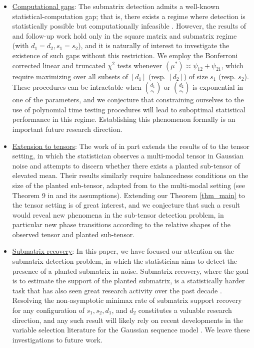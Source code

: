 \documentclass{article}
\theoremstyle{remark}
\begin{document}
\begin{itemize}
    \item \underline{Computational gaps}: The submatrix detection admits a well-known statistical-computation gap; that is, there exists a regime where detection is statistically possible but computationally infeasible \citep{ma2015computational}. However, the results of \citet{ma2015computational} and follow-up work \citep{brennan2019universality, brennan2018reducibility} hold only in the square matrix and submatrix regime (with $d_1 = d_2, s_1 = s_2$), and it is naturally of interest to investigate the existence of such gaps without this restriction. We employ the Bonferroni corrected linear and truncated $\chi^2$ tests whenever $(\mu^*) \asymp \psi_{12} + \psi_{21}$, which require maximizing over all subsets of $[d_1]$ (resp. $[d_2]$) of size $s_1$ (resp. $s_2$). These procedures can be intractable when ${d_1 \choose s_1}$ or ${d_2 \choose s_2}$ is exponential in one of the parameters, and we conjecture that constraining ourselves to the use of polynomial time testing procedures will lead to suboptimal statistical performance in this regime. Establishing this phenomenon formally is an important future research direction.
    \item \underline{Extension to tensors}: The work of \citet{luo2022tensor} in part extends the results of \citet{butucea2013detection} to the tensor setting, in which the statistician observes a multi-modal tensor in Gaussian noise and attempts to discern whether there exists a planted sub-tensor of elevated mean. Their results similarly require balancedness conditions on the size of the planted sub-tensor, adapted from \citet{butucea2013detection} to the multi-modal setting (see Theorem 9 in \citet{luo2022tensor} and its assumptions). Extending our Theorem \ref{thm_main} to the tensor setting is of great interest, and we conjecture that such a result would reveal new phenomena in the sub-tensor detection problem, in particular new phase transitions according to the relative shapes of the observed tensor and planted sub-tensor.
    \item \underline{Submatrix recovery}: In this paper, we have focused our attention on the submatrix detection problem, in which the statistician aims to detect the presence of a planted submatrix in noise. Submatrix recovery, where the goal is to estimate the support of the planted submatrix, is a statistically harder task that has also seen great research activity over the past decade \citep{hajek2018submatrix, cai2017computational,butucea2015sharp,banks2018information, hajek2016semidefinite, dadon2024detection, oren2026inhomogeneous}. Resolving the non-asymptotic minimax rate of submatrix support recovery for any configuration of $s_1, s_2, d_1$, and $d_2$ constitutes a valuable research direction, and any such result will likely rely on recent developments in the variable selection literature for the Gaussian sequence model \citep{butucea2018variable, ndaoud2020optimal, butucea2023variable}. We leave these investigations to future work.
\end{itemize}
\end{document}
